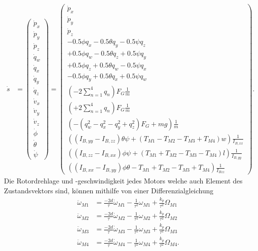 \begin{align}\label{zustandsvektor:zustandsvektor}
	\dot{s} &= 
	\begin{pmatrix}
		\dot{p}_x\\
		\dot{p}_y\\
		\dot{p}_z\\
		\dot{q}_w\\
		\dot{q}_x\\
		\dot{q}_y\\
		\dot{q}_z\\
		\dot{v}_x\\
		\dot{v}_y\\
		\dot{v}_z\\
		\dot{\phi}\\
		\dot{\theta}\\
		\dot{\psi}
	\end{pmatrix} = 
	\begin{pmatrix}
		\dot{p}_x\\
		\dot{p}_y\\
		\dot{p}_z\\
		-0.5\phi q_x - 0.5\theta q_y - 0.5\psi q_z\\
		+0.5\phi q_w - 0.5\theta q_z + 0.5\psi q_y\\
		+0.5\phi q_z + 0.5\theta q_w - 0.5\psi q_x\\
		-0.5\phi q_y + 0.5\theta q_x + 0.5\psi q_w\\
		(-2 \sum_{n=1}^4{q_n}) F_G \frac{1}{m}\\
		(+2 \sum_{n=1}^4{q_n}) F_G \frac{1}{m}\\
		(-(q_w^2-q_x^2-q_y^2+q_z^2) F_G + mg) \frac{1}{m}\\
		((I_{B,yy} - I_{B,zz}) \theta \psi + (T_{M1} - T_{M2} - T_{M3} + T_{M4}) w) \frac{1}{I_{B,xx}}\\
		((I_{B,zz} - I_{B,xx}) \phi \psi + (T_{M1} + T_{M2} - T_{M3} - T_{M4}) l) \frac{1}{I_{B,yy}}\\
		((I_{B,xx} - I_{B,yy}) \phi \theta - T_{M1} + T_{M2} - T_{M3} + T_{M4})\frac{1}{I_{Bzz}}
	\end{pmatrix}.
\end{align}
Die Rotordrehlage und -geschwindigkeit jedes Motors welche auch Element des Zustandsvektors sind, können mithilfe von einer Differenzialgleichung
\begin{align}
	\ddot{\omega}_{M1} &= \frac{-2d}{\tau}\dot{\omega}_{M1} - \frac{1}{\tau^2}\omega_{M1} + \frac{k_p}{\tau^2}\Omega_{M1}\\
	\ddot{\omega}_{M2} &= \frac{-2d}{\tau}\dot{\omega}_{M2} - \frac{1}{\tau^2}\omega_{M2} + \frac{k_p}{\tau^2}\Omega_{M2}\\
	\ddot{\omega}_{M3} &= \frac{-2d}{\tau}\dot{\omega}_{M3} - \frac{1}{\tau^2}\omega_{M3} + \frac{k_p}{\tau^2}\Omega_{M3}\\
	\ddot{\omega}_{M4} &= \frac{-2d}{\tau}\dot{\omega}_{M4} - \frac{1}{\tau^2}\omega_{M4} + \frac{k_p}{\tau^2}\Omega_{M4}.
\end{align}
